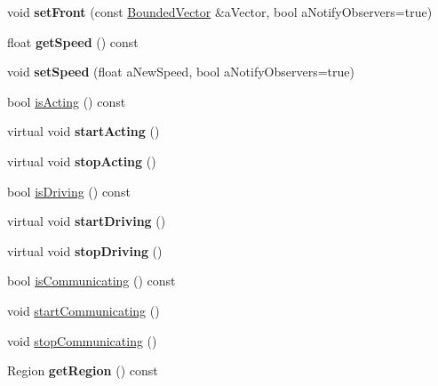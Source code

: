 \begin{DoxyCompactItemize}
\item 
void {\bfseries set\+Front} (const \hyperlink{class_model_1_1_bounded_vector}{Bounded\+Vector} \&a\+Vector, bool a\+Notify\+Observers=true)\hypertarget{class_model_1_1_robot_ad61c7c66fc588a7ba017cbb1f0045e2f}{}\label{class_model_1_1_robot_ad61c7c66fc588a7ba017cbb1f0045e2f}

\item 
float {\bfseries get\+Speed} () const \hypertarget{class_model_1_1_robot_a134d8fa080a68cc524f386c8662be03e}{}\label{class_model_1_1_robot_a134d8fa080a68cc524f386c8662be03e}

\item 
void {\bfseries set\+Speed} (float a\+New\+Speed, bool a\+Notify\+Observers=true)\hypertarget{class_model_1_1_robot_a7471c11187faa28369f0e3846810e128}{}\label{class_model_1_1_robot_a7471c11187faa28369f0e3846810e128}

\item 
bool \hyperlink{class_model_1_1_robot_afedfe806d9fa854cbc641691ef27aada}{is\+Acting} () const 
\item 
virtual void {\bfseries start\+Acting} ()\hypertarget{class_model_1_1_robot_a4cf81acadfb2bb3e92cdbbedd5e53659}{}\label{class_model_1_1_robot_a4cf81acadfb2bb3e92cdbbedd5e53659}

\item 
virtual void {\bfseries stop\+Acting} ()\hypertarget{class_model_1_1_robot_abca861407c0992ee5748b15e772f7840}{}\label{class_model_1_1_robot_abca861407c0992ee5748b15e772f7840}

\item 
bool \hyperlink{class_model_1_1_robot_a0eae3f369405de1ed7f4dcf70aedc348}{is\+Driving} () const 
\item 
virtual void {\bfseries start\+Driving} ()\hypertarget{class_model_1_1_robot_acedb81c962e36fbe88fdd583f6c8f696}{}\label{class_model_1_1_robot_acedb81c962e36fbe88fdd583f6c8f696}

\item 
virtual void {\bfseries stop\+Driving} ()\hypertarget{class_model_1_1_robot_afd92a5235f1a171b02031b694f9bd4e7}{}\label{class_model_1_1_robot_afd92a5235f1a171b02031b694f9bd4e7}

\item 
bool \hyperlink{class_model_1_1_robot_a9ec882e34e2aed582174c127b79c358d}{is\+Communicating} () const 
\item 
void \hyperlink{class_model_1_1_robot_a0178459eef83c12c50056717b3c5b8a8}{start\+Communicating} ()
\item 
void \hyperlink{class_model_1_1_robot_a7aabb3039cde09a96e07d900a5e19972}{stop\+Communicating} ()
\item 
Region {\bfseries get\+Region} () const \hypertarget{class_model_1_1_robot_a49de60413e7391b51632c3137d14d7f2}{}\label{class_model_1_1_robot_a49de60413e7391b51632c3137d14d7f2}


\end{DoxyCompactItemize}
